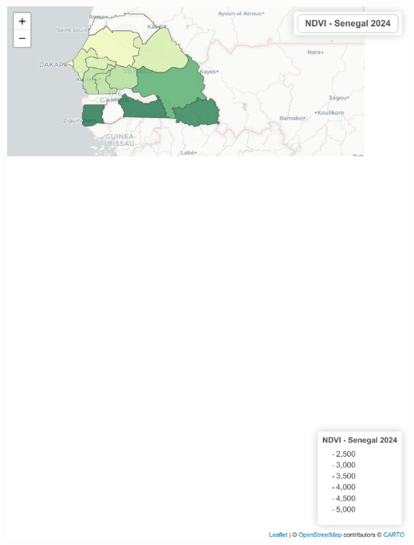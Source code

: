 \documentclass[
]{book}
\begin{document}
\includegraphics{Atlas-Spectral-Sahel_files/figure-latex/ndvi-cartes-1.pdf}
\end{document}
